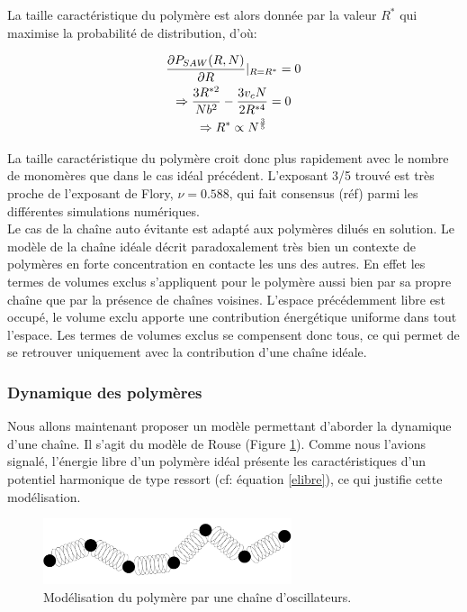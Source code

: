 \documentclass[a4paper,11pt]{article}
\begin{document}
La taille caractéristique du polymère est alors donnée par la valeur $R^*$ qui maximise la probabilité de distribution, d'où:

\begin{gather}
\frac{\partial P_{SAW}(R,N)}{\partial R} \Huge{|} _{R=R^*}=0 \nonumber\\
\Rightarrow \frac{3R^{*2}}{Nb^2}-\frac{3v_cN}{2R^{*4}} =0 \\
\Rightarrow R^* \propto N^\frac{3}{5}\nonumber
\end{gather}


La taille caractéristique du polymère croit donc plus rapidement avec le nombre de monomères que dans le cas idéal précédent. L'exposant 3/5 trouvé est très proche de l'exposant de Flory, $\nu=0.588$, qui fait consensus (réf) parmi les différentes simulations numériques. \\


Le cas de la chaîne auto évitante est adapté aux polymères dilués en solution. Le modèle de la chaîne idéale décrit paradoxalement très bien un contexte de polymères en forte concentration en contacte les uns des autres. En effet les termes de volumes exclus s'appliquent pour le polymère aussi bien par sa propre chaîne que par la présence de chaînes voisines. L'espace précédemment libre est occupé, le volume exclu apporte une contribution énergétique uniforme dans tout l'espace. Les termes de volumes exclus se compensent donc tous, ce qui permet de se retrouver uniquement avec la contribution d'une chaîne idéale.

\subsubsection{Dynamique des polymères}

Nous allons maintenant proposer un modèle permettant d'aborder la dynamique d'une chaîne. Il s'agit du modèle de Rouse (Figure \ref{rouse}). Comme nous l'avions signalé, l'énergie libre d'un polymère idéal présente les caractéristiques d'un potentiel harmonique de type ressort (cf: équation \ref{elibre}), ce qui justifie cette modélisation.

\begin{figure}[H]
\begin{center}
\includegraphics[width=0.65\textwidth]{rouse.jpg}

\caption{Modélisation du polymère par une chaîne d'oscillateurs.}
\label{rouse}
\end{center}
\end{figure}
\end{document}
